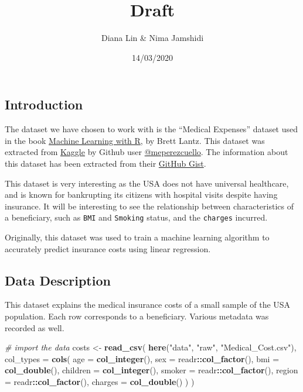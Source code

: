 \documentclass[]{article}
\title{Draft}
\author{Diana Lin \& Nima Jamshidi}
\date{14/03/2020}
\newenvironment{Shaded}{\begin{snugshade}}{\end{snugshade}}
\newcommand{\CommentTok}[1]{\textcolor[rgb]{0.56,0.35,0.01}{\textit{#1}}}
\newcommand{\DataTypeTok}[1]{\textcolor[rgb]{0.13,0.29,0.53}{#1}}
\newcommand{\KeywordTok}[1]{\textcolor[rgb]{0.13,0.29,0.53}{\textbf{#1}}}
\newcommand{\NormalTok}[1]{#1}
\newcommand{\OperatorTok}[1]{\textcolor[rgb]{0.81,0.36,0.00}{\textbf{#1}}}
\newcommand{\StringTok}[1]{\textcolor[rgb]{0.31,0.60,0.02}{#1}}
\begin{document}
\maketitle

\hypertarget{introduction}{%
\subsection{Introduction}\label{introduction}}

The dataset we have chosen to work with is the ``Medical Expenses''
dataset used in the book
\href{https://www.amazon.com/Machine-Learning-R-Brett-Lantz/dp/1782162143}{Machine
Learning with R}, by Brett Lantz. This dataset was extracted from
\href{https://www.kaggle.com/mirichoi0218/insurance/home}{Kaggle} by
Github user
\href{https://gist.github.com/meperezcuello}{@meperezcuello}. The
information about this dataset has been extracted from their
\href{https://gist.github.com/meperezcuello/82a9f1c1c473d6585e750ad2e3c05a41}{GitHub
Gist}.

This dataset is very interesting as the USA does not have universal
healthcare, and is known for bankrupting its citizens with hospital
visits despite having insurance. It will be interesting to see the
relationship between characteristics of a beneficiary, such as
\texttt{BMI} and \texttt{Smoking} status, and the \texttt{charges}
incurred.

Originally, this dataset was used to train a machine learning algorithm
to accurately predict insurance costs using linear regression.

\hypertarget{data-description}{%
\subsection{Data Description}\label{data-description}}

This dataset explains the medical insurance costs of a small sample of
the USA population. Each row corresponds to a beneficiary. Various
metadata was recorded as well.

\begin{Shaded}
\begin{Highlighting}[]
\CommentTok{# import the data }
\NormalTok{costs <-}\StringTok{ }\KeywordTok{read_csv}\NormalTok{(}
  \KeywordTok{here}\NormalTok{(}\StringTok{"data"}\NormalTok{, }\StringTok{"raw"}\NormalTok{, }\StringTok{"Medical_Cost.csv"}\NormalTok{),}
  \DataTypeTok{col_types =} \KeywordTok{cols}\NormalTok{(}
    \DataTypeTok{age =} \KeywordTok{col_integer}\NormalTok{(),}
    \DataTypeTok{sex =}\NormalTok{ readr}\OperatorTok{::}\KeywordTok{col_factor}\NormalTok{(),}
    \DataTypeTok{bmi =} \KeywordTok{col_double}\NormalTok{(),}
    \DataTypeTok{children =} \KeywordTok{col_integer}\NormalTok{(),}
    \DataTypeTok{smoker =}\NormalTok{ readr}\OperatorTok{::}\KeywordTok{col_factor}\NormalTok{(),}
    \DataTypeTok{region =}\NormalTok{ readr}\OperatorTok{::}\KeywordTok{col_factor}\NormalTok{(),}
    \DataTypeTok{charges =} \KeywordTok{col_double}\NormalTok{()}
\NormalTok{  )}
\NormalTok{)}
\end{Highlighting}
\end{Shaded}
\end{document}
